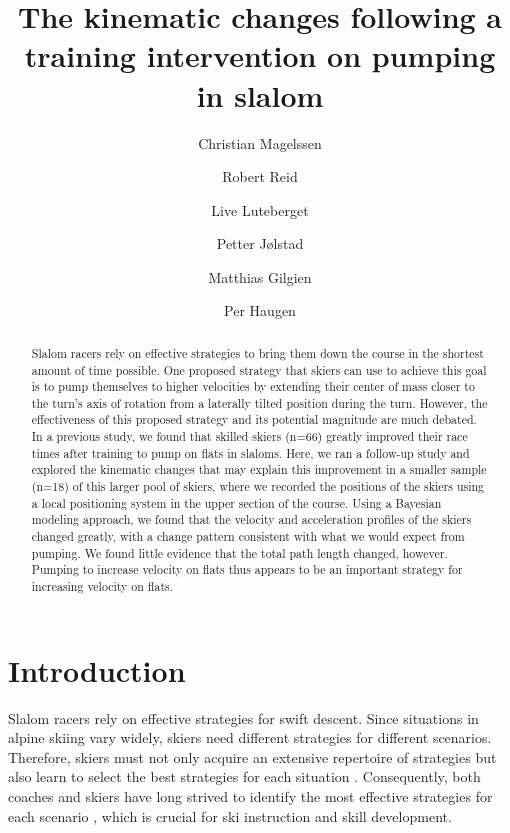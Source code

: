 \documentclass{article}
\author[1]{Christian Magelssen}
\author[2]{Robert Reid}
\author[4]{Live Luteberget}
\author[4]{Petter Jølstad}
\author[3]{Matthias Gilgien}
\author[4]{Per Haugen}
\affil[1]{Department of Mathematics, University X}
\affil[2]{Department of Biology, University Y}
\title{The kinematic changes following a training intervention on pumping in slalom}
\begin{document}
\maketitle

\begin{abstract}
Slalom racers rely on effective strategies to bring them down the course in the shortest amount of time possible. One proposed strategy that skiers can use to achieve this goal is to pump themselves to higher velocities by extending their center of mass closer to the turn's axis of rotation from a laterally tilted position during the turn. However, the effectiveness of this proposed strategy and its potential magnitude are much debated. In a previous study, we found that skilled skiers (n=66) greatly improved their race times after training to pump on flats in slaloms. Here, we ran a follow-up study and explored the kinematic changes that may explain this improvement in a smaller sample (n=18) of this larger pool of skiers, where we recorded the positions of the skiers using a local positioning system in the upper section of the course. Using a Bayesian modeling approach, we found that the velocity and acceleration profiles of the skiers changed greatly, with a change pattern consistent with what we would expect from pumping. We found little evidence that the total path length changed, however. Pumping to increase velocity on flats thus appears to be an important strategy for increasing velocity on flats.
    
\end{abstract}


\section{Introduction}
Slalom racers rely on effective strategies for swift descent\cite{lesnik_best_2007, sporri_course_2012, sporri_turn_2012, lemaster_skiers_1999, lemaster_ultimate_2010}. Since situations in alpine skiing vary widely, skiers need different strategies for different scenarios. Therefore, skiers must not only acquire an extensive repertoire of strategies but also learn to select the best strategies for each situation \cite{supej_impact_2015}. Consequently, both coaches and skiers have long strived to identify the most effective strategies for each scenario \cite{lemaster_skiers_1999, lemaster_ultimate_2010, joubert_how_1967,joubert_ski_1978, howe_new_2001, lind_physics_2013, muller_analysis_1994}, which is crucial for ski instruction and skill development.
\end{document}
